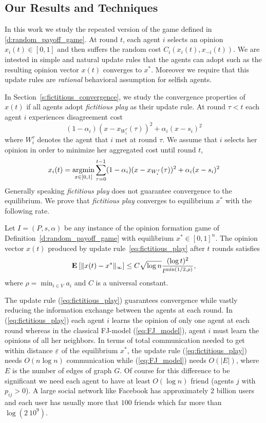 \subsection{Our Results and Techniques}

In this work we study the repeated version of the game defined in \ref{d:random_payoff_game}.
At round $t$, each agent $i$ selects an opinion $x_i(t) \in [0,1]$ and then suffers the 
random cost $C_i(x_i(t),x_{-i}(t))$. We are intested in simple and natural update rules
that the agents can adopt such as the resulting opinion vector $x(t)$ converges to $x^*$.
Moreover we require that this update rules are \emph{rational} behavioral assumption for 
selfish agents.

In Section~\ref{s:fictitious_convergence}, we study the convergence properties of $x(t)$ if all agents adopt \emph{fictitious play}
as their update rule. At round $\tau < t$ each agent $i$ experiences disagreement cost 
\[(1-\alpha_i)(x-x_{W_i^\tau}(\tau))^2+\alpha_i(x-s_i)^2 \]where $W_i^\tau$
denotes the agent that $i$ met at round $\tau$. We assume that $i$ selects her opinion 
in order to minimize her aggregated cost until round $t$,
\begin{equation}\label{eq:fictitious_play}
x_i(t) =\operatorname*{argmin}_{x \in [0,1]}\sum_{\tau=0}^{t-1}(1-\alpha_i)(x-x_{W_i^\tau}(\tau))^2+\alpha_i(x-s_i)^2 
\end{equation}
\noindent Generally speaking \emph{fictitious play} does not guarantee
convergence to the equilibrium. We prove that \emph{fictitious play} 
converges to equilibrium $x^*$ with the following
rate.
\begin{theorem}\label{t:fictitious_convergence}
  Let $I = (P,s, \alpha)$ be any instance of the opinion formation
  game of Definition~\ref{d:random_payoff_game} with equilibrium
  $x^* \in [0,1]^n$.  The opinion vector $x(t)$ produced by
  update rule~\ref{eq:fictitious_play} after $t$ rounds satisfies
  \[
    \bm{\mathrm{E}}_{} \left[ \| x(t) - x^* \|_{\infty} \right] \leq
    C \sqrt{\log n}\frac{(\log t)^{2}}{t^{\min(1/2,\rho)}},
  \]
  where $\rho = \min_{i \in V} a_i$ and $C$ is a universal constant.
\end{theorem}
The update rule (\ref{eq:fictitious_play}) guarantees convergence
while vastly reducing the information exchange between the agents
at each round. In (\ref{eq:fictitious_play}) each agent $i$ learns the opinion of only one agent
at each round whereas in the classical FJ-model (\ref{eq:FJ_model}), agent $i$ must
learn the opinions of all her neighbors. In terms of
total communication needed to get within distance $\varepsilon$ of the
equilibrium $x^*$, the update rule (\ref{eq:fictitious_play}) needs
$O(n \log n)$ communication while (\ref{eq:FJ_model}) needs
$O(|E|)$, where $E$ is the number of edges of graph $G$. 
Of course for this difference to be significant we need
each agent to have at least $O(\log n)$ friend (agents $j$ with $p_{ij}>0$). A large social
network like Facebook has approximately $2$ billion users and each user
has usually more that $100$ friends which far more than $\log(2\ 10^9)$.

